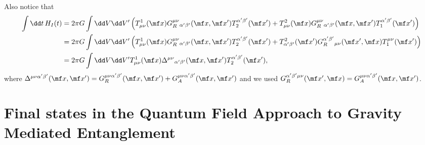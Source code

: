 {Also notice that
\begin{align}
    \int \dd t\, H_I(t) &= 2 \pi G\int \dd V \dd V'\left( T^1_{\mu\nu}(\mf x) G_R^{\mu\nu}{}_{\alpha'\beta'}(\mf x, \mf x')T_2^{\alpha' \beta'}(\mf x') +  T^2_{\mu\nu}(\mf x) G_R^{\mu\nu}{}_{\alpha'\beta'}(\mf x, \mf x')T_1^{\alpha' \beta'}(\mf x')\right) \nonumber\\
    &= 2 \pi G\int \dd V \dd V'\left( T^1_{\mu\nu}(\mf x) G_R^{\mu\nu}{}_{\alpha'\beta'}(\mf x, \mf x')T_2^{\alpha' \beta'}(\mf x') +  T^2_{\alpha'\beta'}(\mf x') G_R^{\alpha'\beta'}{}_{\mu\nu}(\mf x', \mf x)T_1^{\mu \nu}(\mf x')\right) \nonumber\\
    &= 2 \pi G\int \dd V \dd V' T^1_{\mu\nu}(\mf x) \Delta^{\mu\nu}{}_{\alpha'\beta'}(\mf x, \mf x')T_2^{\alpha' \beta'}(\mf x'),
\end{align}
where $\Delta^{\mu\nu\alpha'\beta'}(\mf x, \mf x') = G_R^{\mu\nu\alpha'\beta'}(\mf x, \mf x') + G_A^{\mu\nu\alpha'\beta'}(\mf x,\mf x')$ and we used $G_R^{\alpha'\beta'\mu\nu}(\mf x',\mf x) = G_A^{\mu\nu\alpha'\beta'}(\mf x,\mf x')$.




\chapter{Final states in the Quantum Field Approach to Gravity Mediated Entanglement}\label{app:FinalStates}

}
